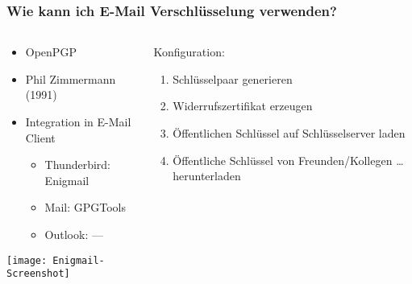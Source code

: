 \begin{frame}
  \frametitle{Wie kann ich E-Mail Verschlüsselung verwenden?}
  \begin{columns}[c]
    \begin{column}{0.5\textwidth}
      \begin{itemize}
        \item OpenPGP
        \item Phil Zimmermann (1991)
        \item Integration in E-Mail Client
        \begin{itemize}
          \item Thunderbird: Enigmail
          \item Mail: GPGTools
          \item Outlook: ---
        \end{itemize}
      \end{itemize}
      \center \texttt{[image: Enigmail-Screenshot]}\\
    \end{column}
    \begin{column}{0.5\textwidth}
          Konfiguration:
      \begin{enumerate}
        \item Schlüsselpaar generieren
        \item Widerrufszertifikat erzeugen
        \item Öffentlichen Schlüssel auf Schlüsselserver laden
        \item Öffentliche Schlüssel von Freunden/Kollegen \ldots{} herunterladen
      \end{enumerate}
    \end{column}
  \end{columns}

\end{frame}
